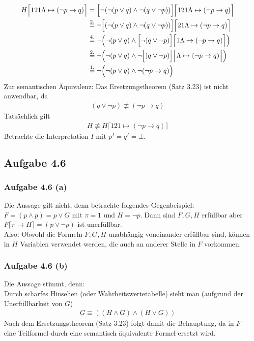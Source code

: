 \begin{align*}
	H\Big\lceil 121\Lambda\mapsto(\neg p\to q)\Big\rceil
	&=
	\Big[\neg(\neg(p\vee q)\wedge\neg(q\vee\neg p))\Big]\Big\lceil 121\Lambda\mapsto(\neg p\to q)\Big\rceil\\
	&\stackrel{\text{2.}}{=}
	\neg\Big[(\neg(p\vee q)\wedge\neg(q\vee\neg p))\Big]\Big\lceil 21\Lambda\mapsto(\neg p\to q)\Big\rceil\\
	&\stackrel{\text{4.}}{=}
	\neg\Big(\neg(p\vee q)\wedge\Big[\neg(q\vee\neg p)\Big]\Big\lceil 1\Lambda\mapsto(\neg p\to q)\Big\rceil\Big)\\
	&\stackrel{\text{2.}}{=}
	\neg\Big(\neg(p\vee q)\wedge\neg\Big[(q\vee\neg p)\Big]\Big\lceil\Lambda\mapsto(\neg p\to q)\Big\rceil\Big)\\
	&\stackrel{\text{1.}}{=}
	\neg\Big(\neg(p\vee q)\wedge\neg(\neg p\to q)\Big)
\end{align*}
Zur semantischen Äquivalenz: Das Ersetzungstheorem (Satz 3.23) ist nicht anwendbar, da 
\begin{align*}
	(q\vee\neg p)\not\equiv(\neg p\to q)
\end{align*}
Tatsächlich gilt
\begin{align*}
	H\not\equiv H\lceil 121\mapsto(\neg p\to q)\rceil
\end{align*}
Betrachte die Interpretation $I$ mit $p^I=q^I=\bot$.

\subsection{Aufgabe 4.6}
\subsubsection{Aufgabe 4.6 (a)}
Die Aussage gilt nicht, denn betrachte folgendes Gegenbeispiel:\\
$F=(p\wedge p)=p\vee G$ mit $\pi=1$ und $H=\neg p$. 
Dann sind $F,G,H$ erfüllbar aber \\
$F\lceil\pi\to H\rceil=(p\vee\neg p)$ ist unerfüllbar.\\
Also: Obwohl die Formeln $F,G,H$ unabhängig voneinander erfüllbar sind, können in $H$ Variablen verwendet werden, die auch an anderer Stelle in $F$ vorkommen.

\subsubsection{Aufgabe 4.6 (b)}
Die Aussage stimmt, denn:\\
Durch scharfes Hinsehen (oder Wahrheitswertetabelle) sieht man (aufgrund der Unerfüllbarkeit von $G$)
\begin{align*}
	G\equiv((H\wedge G)\wedge(H\vee G))
\end{align*}
Nach dem Ersetzungstheorem (Satz 3.23) folgt damit die Behauptung, da in $F$ eine Teilformel durch eine semantisch äquivalente Formel ersetzt wird.

